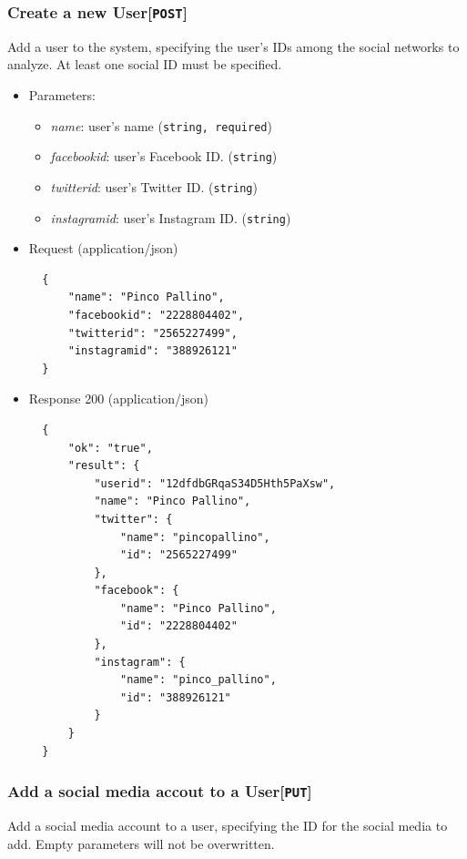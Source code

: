 \subsubsection{Create a new User{[}\protect\texttt{POST}{]}}

Add a user to the system, specifying the user's IDs among the social networks to analyze. At least one social ID must be specified.

\begin{itemize}
\item
  Parameters:

  \begin{itemize}
  \item
    \textit{name}: user's name (\texttt{string, required})
  \item
    \textit{facebookid}: user's Facebook ID. (\texttt{string})
  \item
    \textit{twitterid}: user's Twitter ID. (\texttt{string})
  \item
    \textit{instagramid}: user's Instagram ID. (\texttt{string})
  \end{itemize}
\item
  Request (application/json)

\begin{verbatim}
  {
      "name": "Pinco Pallino",
      "facebookid": "2228804402",
      "twitterid": "2565227499",
      "instagramid": "388926121"
  }
\end{verbatim}
\item
  Response 200 (application/json)

\begin{verbatim}
  {
      "ok": "true",
      "result": {
          "userid": "12dfdbGRqaS34D5Hth5PaXsw",
          "name": "Pinco Pallino",
          "twitter": {
              "name": "pincopallino",
              "id": "2565227499"
          },
          "facebook": {
              "name": "Pinco Pallino",
              "id": "2228804402"
          },
          "instagram": {
              "name": "pinco_pallino",
              "id": "388926121"
          }
      }
  }
\end{verbatim}
\end{itemize}

\subsubsection{Add a social media accout to a User{[}\protect\texttt{PUT}{]}}

Add a social media account to a user, specifying the ID for the social media to add. Empty parameters will not be overwritten.

